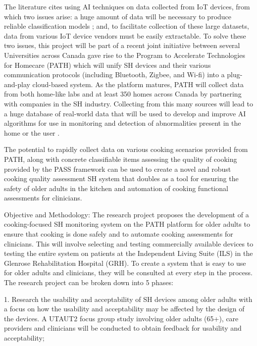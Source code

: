 The literature cites using AI techniques on data collected from IoT devices, from which two issues arise: a huge amount of data will be necessary to produce reliable classification models \cite{sarker_machine_2021}; and, to facilitate collection of these large datasets, data from various IoT device vendors must be easily extractable. To solve these two issues, this project will be part of a recent joint initiative between several Universities across Canada gave rise to the Program to Accelerate Technologies for Homecare (PATH) which will unify SH devices and their various communication protocols (including Bluetooth, Zigbee, and Wi-fi) into a plug-and-play cloud-based system. As the platform matures, PATH will collect data from both home-like labs and at least 350 homes across Canada by partnering with companies in the SH industry. Collecting from this many sources will lead to a huge database of real-world data that will be used to develop and improve AI algorithms for use in monitoring and detection of abnormalities present in the home or the user \cite{noauthor_path_nodate}.

The potential to rapidly collect data on various cooking scenarios provided from PATH, along with concrete classifiable items assessing the quality of cooking provided by the PASS framework can be used to create a novel and robust cooking quality assessment SH system that doubles as a tool for ensuring the safety of older adults in the kitchen and automation of cooking functional assessments for clinicians.

Objective and Methodology: The research project proposes the development of a cooking-focused SH monitoring system on the PATH platform for older adults to ensure that cooking is done safely and to automate cooking assessments for clinicians. This will involve selecting and testing commercially available devices to testing the entire system on patients at the Independent Living Suite (ILS) in the Glenrose Rehabilitation Hospital (GRH). To create a system that is easy to use for older adults and clinicians, they will be consulted at every step in the process. The research project can be broken down into 5 phases:

1.     Research the usability and acceptability of SH devices among older adults with a focus on how the usability and acceptability may be affected by the design of the devices. A UTAUT2 focus group study involving older adults (65+), care providers and clinicians will be conducted to obtain feedback for usability and acceptability;

